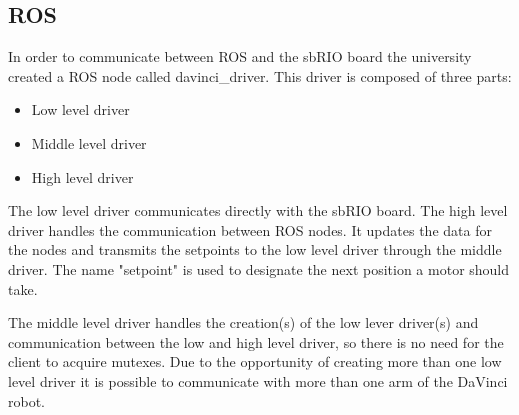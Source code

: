 \subsection{ROS}\label{sec:ros}

In order to communicate between ROS and the sbRIO board the university created a ROS node called davinci\_driver. This driver is composed of three parts:

\begin{itemize}
\item Low level driver
\item Middle level driver
\item High level driver
\end{itemize}

The low level driver communicates directly with the sbRIO board. The high level driver handles the communication between ROS nodes. It updates the data for the nodes and transmits the setpoints to the low level driver through the middle driver. The name "setpoint" is used to designate the next position a motor should take.

The middle level driver handles the creation(s) of the low lever driver(s) and communication between the low and high level driver, so there is no need for the client to acquire mutexes. Due to the opportunity of creating more than one low level driver it is possible to communicate with more than one arm of the DaVinci robot.


